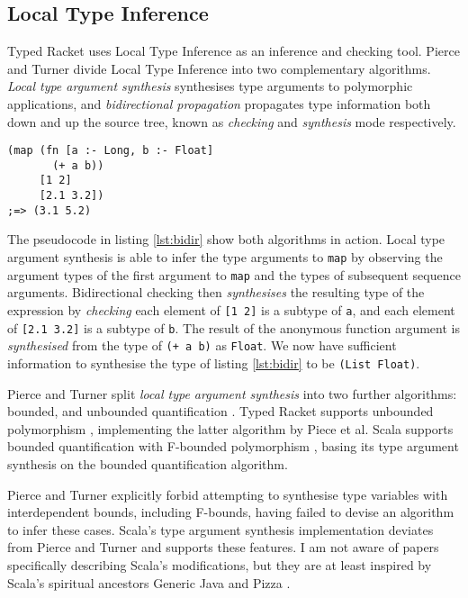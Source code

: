 \subsection{Local Type Inference}

Typed Racket uses Local Type Inference \cite{Pierce:2000:LTI:345099.345100}
as an inference and checking tool. Pierce and Turner
\cite{Pierce:2000:LTI:345099.345100} divide Local Type Inference into
two complementary algorithms. \emph{Local type argument synthesis}
synthesises type arguments to polymorphic applications, and \emph{bidirectional
propagation} propagates type information both down and up the source tree,
known as \emph{checking} and \emph{synthesis} mode respectively.

\begin{lstlisting}[caption=Bidirectional checking algorithm with Typed Clojure pseudocode, label=lst:bidir]
(map (fn [a :- Long, b :- Float]
       (+ a b))
     [1 2]
     [2.1 3.2])
;=> (3.1 5.2)
\end{lstlisting}

The pseudocode in listing \ref{lst:bidir} show both algorithms in action. Local type argument synthesis is able
to infer the type arguments to \lstinline|map| by observing the argument types of the first
argument to \lstinline|map| and the types of subsequent sequence arguments. Bidirectional checking
then \emph{synthesises} the resulting type of the expression by \emph{checking} each element
of \lstinline|[1 2]| is a subtype of \lstinline|a|, and each element of \lstinline|[2.1 3.2]| is a subtype of
\lstinline|b|. The result of the anonymous function argument is \emph{synthesised} from the type of
\lstinline|(+ a b)| as \lstinline|Float|. We now have sufficient information to 
synthesise the type of listing \ref{lst:bidir} to be \lstinline|(List Float)|.

Pierce and Turner split \emph{local type argument synthesis} into two further
algorithms: bounded, and unbounded quantification \cite{Pierce:2000:LTI:345099.345100}. 
Typed Racket 
supports unbounded polymorphism \cite{SAMTH:dissertation}, implementing the latter algorithm by Piece et al.
Scala supports bounded quantification with F-bounded polymorphism \cite{Canning:1989:FPO:99370.99392},
basing its type argument synthesis on the bounded quantification algorithm.

Pierce and Turner explicitly forbid \cite{Pierce:2000:LTI:345099.345100}
attempting to synthesise type variables with interdependent bounds, including
F-bounds, having failed to devise an algorithm to infer these cases.
Scala's type argument synthesis implementation deviates from Pierce and Turner and supports these features.
I am not aware of papers specifically describing Scala's modifications, but they are at least inspired by
Scala's spiritual ancestors Generic Java \cite{Bracha98gj:extending} and Pizza \cite{Odersky97pizzainto}.

